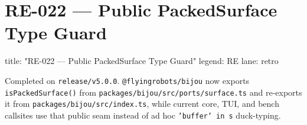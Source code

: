 \chapter{RE-022 --- Public PackedSurface Type Guard}\label{record-375}

\smallskip

\begin{RecordMeta}
title: "RE-022 — Public PackedSurface Type Guard"
legend: RE
lane: retro

\end{RecordMeta}

Completed on \texttt{r\allowbreak{}e\allowbreak{}l\allowbreak{}e\allowbreak{}a\allowbreak{}s\allowbreak{}e\allowbreak{}/\allowbreak{}v\allowbreak{}5\allowbreak{}.\allowbreak{}0\allowbreak{}.\allowbreak{}0}. \texttt{@\allowbreak{}f\allowbreak{}l\allowbreak{}y\allowbreak{}i\allowbreak{}n\allowbreak{}g\allowbreak{}r\allowbreak{}o\allowbreak{}b\allowbreak{}o\allowbreak{}t\allowbreak{}s\allowbreak{}/\allowbreak{}b\allowbreak{}i\allowbreak{}j\allowbreak{}o\allowbreak{}u} now exports \texttt{i\allowbreak{}s\allowbreak{}P\allowbreak{}a\allowbreak{}c\allowbreak{}k\allowbreak{}e\allowbreak{}d\allowbreak{}S\allowbreak{}u\allowbreak{}r\allowbreak{}f\allowbreak{}a\allowbreak{}c\allowbreak{}e\allowbreak{}(\allowbreak{})} from \texttt{p\allowbreak{}a\allowbreak{}c\allowbreak{}k\allowbreak{}a\allowbreak{}g\allowbreak{}e\allowbreak{}s\allowbreak{}/\allowbreak{}b\allowbreak{}i\allowbreak{}j\allowbreak{}o\allowbreak{}u\allowbreak{}/\allowbreak{}s\allowbreak{}r\allowbreak{}c\allowbreak{}/\allowbreak{}p\allowbreak{}o\allowbreak{}r\allowbreak{}t\allowbreak{}s\allowbreak{}/\allowbreak{}s\allowbreak{}u\allowbreak{}r\allowbreak{}f\allowbreak{}a\allowbreak{}c\allowbreak{}e\allowbreak{}.\allowbreak{}t\allowbreak{}s} and re-exports it from \texttt{p\allowbreak{}a\allowbreak{}c\allowbreak{}k\allowbreak{}a\allowbreak{}g\allowbreak{}e\allowbreak{}s\allowbreak{}/\allowbreak{}b\allowbreak{}i\allowbreak{}j\allowbreak{}o\allowbreak{}u\allowbreak{}/\allowbreak{}s\allowbreak{}r\allowbreak{}c\allowbreak{}/\allowbreak{}i\allowbreak{}n\allowbreak{}d\allowbreak{}e\allowbreak{}x\allowbreak{}.\allowbreak{}t\allowbreak{}s}, while current core, TUI, and bench callsites use that public seam instead of ad hoc \texttt{'\allowbreak{}b\allowbreak{}u\allowbreak{}f\allowbreak{}f\allowbreak{}e\allowbreak{}r\allowbreak{}'\allowbreak{} \allowbreak{}i\allowbreak{}n\allowbreak{} \allowbreak{}s} duck-typing.

